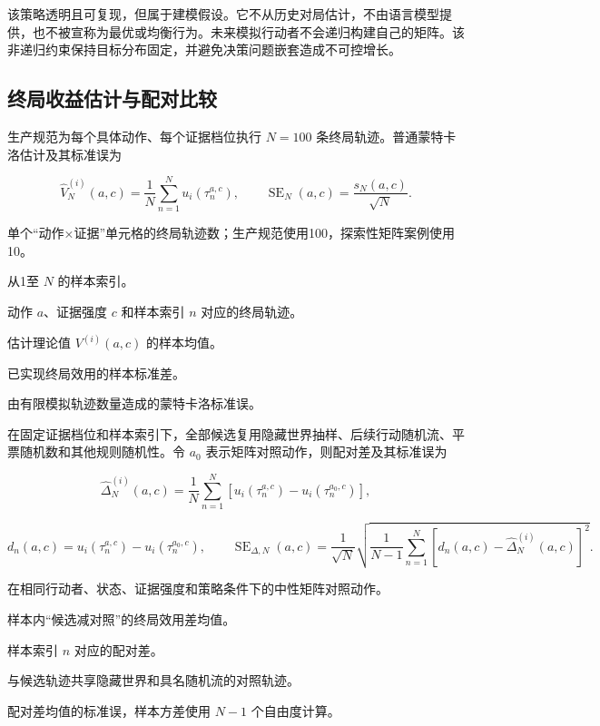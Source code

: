 \documentclass[UTF8,11pt,a4paper,fontset=windows]{ctexart}
\begin{document}
该策略透明且可复现，但属于建模假设。它不从历史对局估计，不由语言模型提供，也不被宣称为最优或均衡行为。未来模拟行动者不会递归构建自己的矩阵。该非递归约束保持目标分布固定，并避免决策问题嵌套造成不可控增长。

\subsection{终局收益估计与配对比较}

生产规范为每个具体动作、每个证据档位执行 $N=100$ 条终局轨迹。普通蒙特卡洛估计及其标准误为

\[
\widehat V_N^{(i)}(a,c)=\frac{1}{N}\sum_{n=1}^{N}u_i(\tau_n^{a,c}),
\qquad
\operatorname{SE}_N(a,c)=\frac{s_N(a,c)}{\sqrt N}.
\]

\begin{description}[style=nextline,leftmargin=3.4cm,labelwidth=3.0cm]
  \item[$N$] 单个“动作×证据”单元格的终局轨迹数；生产规范使用100，探索性矩阵案例使用10。
  \item[$n$] 从1至 $N$ 的样本索引。
  \item[$\tau_n^{a,c}$] 动作 $a$、证据强度 $c$ 和样本索引 $n$ 对应的终局轨迹。
  \item[$\widehat V_N^{(i)}(a,c)$] 估计理论值 $V^{(i)}(a,c)$ 的样本均值。
  \item[$s_N(a,c)$] 已实现终局效用的样本标准差。
  \item[$\operatorname{SE}_N(a,c)$] 由有限模拟轨迹数量造成的蒙特卡洛标准误。
\end{description}

在固定证据档位和样本索引下，全部候选复用隐藏世界抽样、后续行动随机流、平票随机数和其他规则随机性。令 $a_0$ 表示矩阵对照动作，则配对差及其标准误为

\[
\widehat\Delta_N^{(i)}(a,c)
=\frac{1}{N}\sum_{n=1}^{N}
\left[u_i(\tau_n^{a,c})-u_i(\tau_n^{a_0,c})\right],
\]

\[
d_n(a,c)=u_i(\tau_n^{a,c})-u_i(\tau_n^{a_0,c}),
\qquad
\operatorname{SE}_{\Delta,N}(a,c)
=\frac{1}{\sqrt N}
\sqrt{\frac{1}{N-1}\sum_{n=1}^{N}
\left[d_n(a,c)-\widehat\Delta_N^{(i)}(a,c)\right]^2}.
\]

\begin{description}[style=nextline,leftmargin=3.4cm,labelwidth=3.0cm]
  \item[$a_0$] 在相同行动者、状态、证据强度和策略条件下的中性矩阵对照动作。
  \item[$\widehat\Delta_N^{(i)}(a,c)$] 样本内“候选减对照”的终局效用差均值。
  \item[$d_n(a,c)$] 样本索引 $n$ 对应的配对差。
  \item[$\tau_n^{a_0,c}$] 与候选轨迹共享隐藏世界和具名随机流的对照轨迹。
  \item[$\operatorname{SE}_{\Delta,N}(a,c)$] 配对差均值的标准误，样本方差使用 $N-1$ 个自由度计算。
\end{description}
\end{document}
